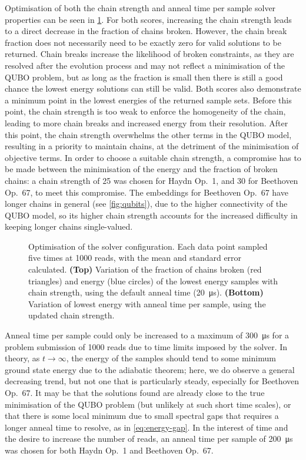 \documentclass[12pt]{article}
\theoremstyle{definition}
\begin{document}
Optimisation of both the chain strength and anneal time per sample solver properties can be seen in \cref{fig:solver-configuration}. For both scores, increasing the chain strength leads to a direct decrease in the fraction of chains broken. However, the chain break fraction does not necessarily need to be exactly zero for valid solutions to be returned. Chain breaks increase the likelihood of broken constraints, as they are resolved after the evolution process and may not reflect a minimisation of the QUBO problem, but as long as the fraction is small then there is still a good chance the lowest energy solutions can still be valid. Both scores also demonstrate a minimum point in the lowest energies of the returned sample sets. Before this point, the chain strength is too weak to enforce the homogeneity of the chain, leading to more chain breaks and increased energy from their resolution. After this point, the chain strength overwhelms the other terms in the QUBO model, resulting in a priority to maintain chains, at the detriment of the minimisation of objective terms. In order to choose a suitable chain strength, a compromise has to be made between the minimisation of the energy and the fraction of broken chains: a chain strength of \num{25} was chosen for Haydn Op.\ 1, and \num{30} for Beethoven Op.\ 67, to meet this compromise. The embeddings for Beethoven Op.\ 67 have longer chains in general (see \cref{fig:qubits}), due to the higher connectivity of the QUBO model, so its higher chain strength accounts for the increased difficulty in keeping longer chains single-valued.

\begin{figure}[!t]
    \centering\footnotesize
    
    \caption{Optimisation of the solver configuration. Each data point sampled five times at \num{1000} reads, with the mean and standard error calculated. \textbf{(Top)} Variation of the fraction of chains broken (red triangles) and energy (blue circles) of the lowest energy samples with chain strength, using the default anneal time (\qty{20}{\us}).  \textbf{(Bottom)} Variation of lowest energy with anneal time per sample, using the updated chain strength.}
    \label{fig:solver-configuration}
\end{figure}

Anneal time per sample could only be increased to a maximum of \qty{300}{\us} for a problem submission of \num{1000} reads due to time limits imposed by the solver. In theory, as $t\to\infty$, the energy of the samples should tend to some minimum ground state energy due to the adiabatic theorem; here, we do observe a general decreasing trend, but not one that is particularly steady, especially for Beethoven Op.\ 67. It may be that the solutions found are already close to the true minimisation of the QUBO problem (but unlikely at such short time scales), or that there is some local minimum due to small spectral gaps that requires a longer anneal time to resolve, as in \cref{eq:energy-gap}. In the interest of time and the desire to increase the number of reads, an anneal time per sample of \qty{200}{\us} was chosen for both Haydn Op.\ 1 and Beethoven Op.\ 67.
\end{document}
